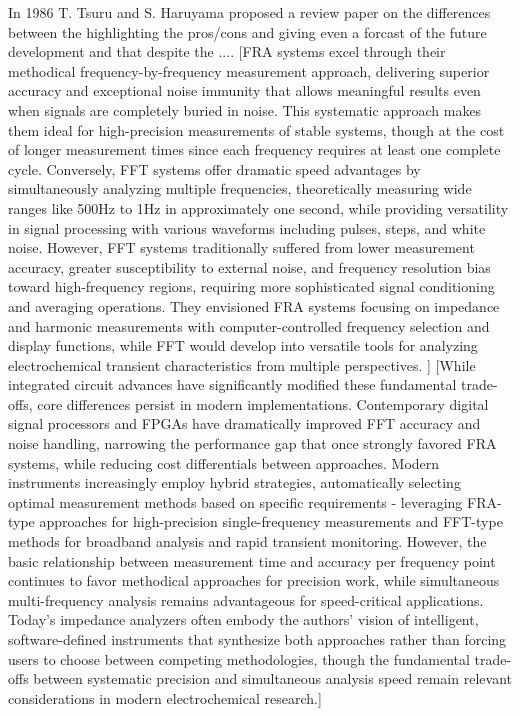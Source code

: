 In 1986 T. Tsuru and S. Haruyama \cite{1986296} proposed a review paper on the differences between the 
highlighting the pros/cons and giving even a forcast of the future development and that despite the .... 
[FRA systems excel through their methodical frequency-by-frequency measurement approach, delivering superior accuracy and exceptional noise immunity that allows meaningful results even when signals are completely buried in noise. This systematic approach makes them ideal for high-precision measurements of stable systems, though at the cost of longer measurement times since each frequency requires at least one complete cycle. Conversely, FFT systems offer dramatic speed advantages by simultaneously analyzing multiple frequencies, theoretically measuring wide ranges like 500Hz to 1Hz in approximately one second, while providing versatility in signal processing with various waveforms including pulses, steps, and white noise. However, FFT systems traditionally suffered from lower measurement accuracy, greater susceptibility to external noise, and frequency resolution bias toward high-frequency regions, requiring more sophisticated signal conditioning and averaging operations. They envisioned FRA systems focusing on impedance and harmonic measurements with computer-controlled frequency selection and display functions, while FFT would develop into versatile tools for analyzing electrochemical transient characteristics from multiple perspectives. ]
[While integrated circuit advances have significantly modified these fundamental trade-offs, core differences persist in modern implementations. Contemporary digital signal processors and FPGAs have dramatically improved FFT accuracy and noise handling, narrowing the performance gap that once strongly favored FRA systems, while reducing cost differentials between approaches. Modern instruments increasingly employ hybrid strategies, automatically selecting optimal measurement methods based on specific requirements - leveraging FRA-type approaches for high-precision single-frequency measurements and FFT-type methods for broadband analysis and rapid transient monitoring. However, the basic relationship between measurement time and accuracy per frequency point continues to favor methodical approaches for precision work, while simultaneous multi-frequency analysis remains advantageous for speed-critical applications. Today's impedance analyzers often embody the authors' vision of intelligent, software-defined instruments that synthesize both approaches rather than forcing users to choose between competing methodologies, though the fundamental trade-offs between systematic precision and simultaneous analysis speed remain relevant considerations in modern electrochemical research.]

